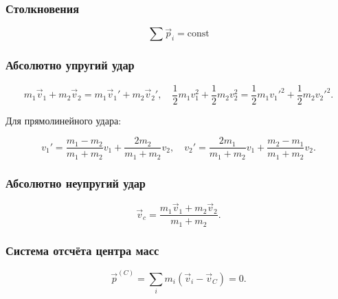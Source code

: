\documentclass[12pt, a4paper]{article}
\begin{document}
\subsubsection*{Столкновения}

\[
\sum \vec p_i = \text{const}
\]

\subsubsection*{Абсолютно упругий удар}

\[
m_1\vec v_{1}+m_2\vec v_{2}=m_1\vec v_{1}'+m_2\vec v_{2}',
\quad
\frac12m_1v_{1}^2+\frac12m_2v_{2}^2
=\frac12m_1{v_{1}'}^2+\frac12m_2{v_{2}'}^2.
\]

Для прямолинейного удара:

\[
v_{1}'=\frac{m_1-m_2}{m_1+m_2}v_{1}+\frac{2m_2}{m_1+m_2}v_{2}, 
\quad
v_{2}'=\frac{2m_1}{m_1+m_2}v_{1}+\frac{m_2-m_1}{m_1+m_2}v_{2}.
\]

\subsubsection*{Абсолютно неупругий удар}

\[
\vec v_c=\frac{m_1\vec v_{1}+m_2\vec v_{2}}{m_1+m_2}.
\]

\subsubsection*{Система отсчёта центра масс}

\[
\vec p^{(C)} = \sum_i m_i(\vec v_i - \vec v_C) = 0.
\]
\end{document}
